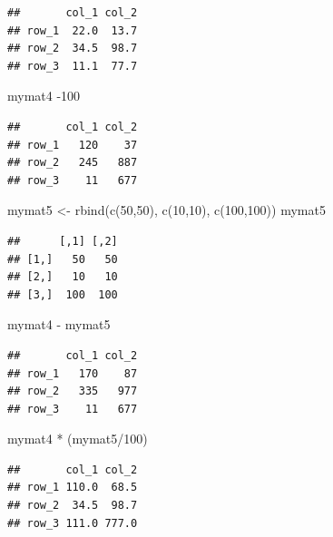 \documentclass[
]{book}
\newenvironment{Shaded}{\begin{snugshade}}{\end{snugshade}}
\newcommand{\DecValTok}[1]{\textcolor[rgb]{0.00,0.00,0.81}{#1}}
\newcommand{\FunctionTok}[1]{\textcolor[rgb]{0.00,0.00,0.00}{#1}}
\newcommand{\NormalTok}[1]{#1}
\newcommand{\OtherTok}[1]{\textcolor[rgb]{0.56,0.35,0.01}{#1}}
\newcommand{\SpecialCharTok}[1]{\textcolor[rgb]{0.00,0.00,0.00}{#1}}
\begin{document}
\begin{verbatim}
##       col_1 col_2
## row_1  22.0  13.7
## row_2  34.5  98.7
## row_3  11.1  77.7
\end{verbatim}

\begin{Shaded}
\begin{Highlighting}[]
\NormalTok{mymat4 }\SpecialCharTok{{-}}\DecValTok{100}
\end{Highlighting}
\end{Shaded}

\begin{verbatim}
##       col_1 col_2
## row_1   120    37
## row_2   245   887
## row_3    11   677
\end{verbatim}

\begin{Shaded}
\begin{Highlighting}[]
\NormalTok{mymat5 }\OtherTok{\textless{}{-}} \FunctionTok{rbind}\NormalTok{(}\FunctionTok{c}\NormalTok{(}\DecValTok{50}\NormalTok{,}\DecValTok{50}\NormalTok{), }\FunctionTok{c}\NormalTok{(}\DecValTok{10}\NormalTok{,}\DecValTok{10}\NormalTok{), }\FunctionTok{c}\NormalTok{(}\DecValTok{100}\NormalTok{,}\DecValTok{100}\NormalTok{))}
\NormalTok{mymat5}
\end{Highlighting}
\end{Shaded}

\begin{verbatim}
##      [,1] [,2]
## [1,]   50   50
## [2,]   10   10
## [3,]  100  100
\end{verbatim}

\begin{Shaded}
\begin{Highlighting}[]
\NormalTok{mymat4 }\SpecialCharTok{{-}}\NormalTok{ mymat5}
\end{Highlighting}
\end{Shaded}

\begin{verbatim}
##       col_1 col_2
## row_1   170    87
## row_2   335   977
## row_3    11   677
\end{verbatim}

\begin{Shaded}
\begin{Highlighting}[]
\NormalTok{mymat4 }\SpecialCharTok{*}\NormalTok{ (mymat5}\SpecialCharTok{/}\DecValTok{100}\NormalTok{)}
\end{Highlighting}
\end{Shaded}

\begin{verbatim}
##       col_1 col_2
## row_1 110.0  68.5
## row_2  34.5  98.7
## row_3 111.0 777.0
\end{verbatim}
\end{document}
